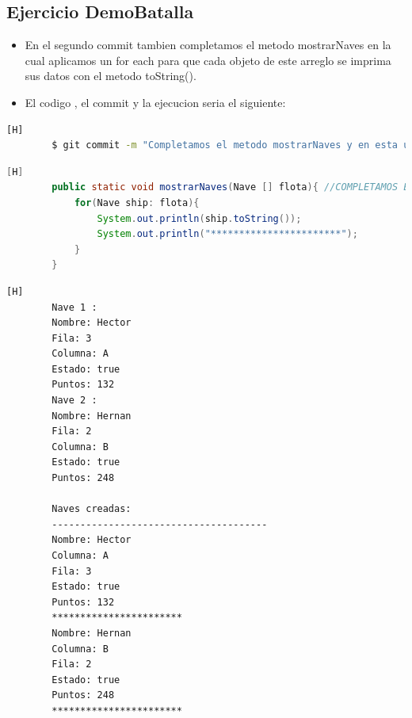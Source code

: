 \documentclass{article}
\begin{document}
	\subsection{Ejercicio DemoBatalla}
	\begin{itemize}	
		\item En el segundo commit tambien completamos el metodo mostrarNaves en la cual aplicamos un for each para que cada objeto de este arreglo se imprima sus datos con el metodo toString().
		\item El codigo , el commit y la ejecucion seria el siguiente:
	\end{itemize}	
	\begin{lstlisting}[language=bash,caption={Commit}][H]
		$ git commit -m "Completamos el metodo mostrarNaves y en esta usamos un for each y el metodo toString() para mostrar datos de cada objeto y tambien le ponemos un tamano al arreglo de 2 para hacer pruebas"
	\end{lstlisting}	
	\begin{lstlisting}[language=java,caption={Las lineas de codigo del metodo completado:}][H]
        public static void mostrarNaves(Nave [] flota){ //COMPLETAMOS EL METODO mostrarNaves Y NOS AYUDAMOS DE UN FOR EACH PARA EL MUESTREO DE LOS DATOS DE CADA OBJETO Y TAMBIEN USAMOS EL METODO toString()
            for(Nave ship: flota){
                System.out.println(ship.toString());
                System.out.println("***********************");
            }
        }
	\end{lstlisting}
    \begin{lstlisting}[language=bash,caption={La ejecucion dada:}][H]
        Nave 1 : 
        Nombre: Hector
        Fila: 3
        Columna: A
        Estado: true
        Puntos: 132
        Nave 2 : 
        Nombre: Hernan
        Fila: 2
        Columna: B
        Estado: true
        Puntos: 248

        Naves creadas:
        --------------------------------------
        Nombre: Hector
        Columna: A
        Fila: 3
        Estado: true
        Puntos: 132
        ***********************
        Nombre: Hernan
        Columna: B
        Fila: 2
        Estado: true
        Puntos: 248
        ***********************

    \end{lstlisting}
\end{document}

